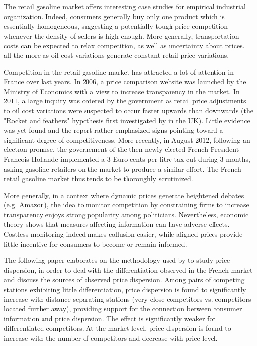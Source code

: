 \documentclass[english]{article}
\begin{document}
The retail gasoline market offers interesting case studies for empirical industrial organization. Indeed, consumers generally buy only one product which is essentially homogeneous, suggesting a potentially tough price competition whenever the density of sellers is high enough. More generally, transportation costs can be expected to relax competition, as well as uncertainty about prices, all the more as oil cost variations generate constant retail price variations.

Competition in the retail gasoline market has attracted a lot of attention in France over last years. In 2006, a price comparison website was launched by the Ministry of Economics with a view to increase transparency in the market. In 2011, a large inquiry was ordered by the government as retail price adjustments to oil cost variations were suspected to occur faster upwards than downwards (the "Rocket and feathers" hypothesis first investigated by \cite{BAC91} in the UK). Little evidence was yet found and the report rather emphasized signs pointing toward a significant degree of competitiveness. More recently, in August 2012, following an election promise, the governement of the then newly elected French President Francois Hollande implemented a 3 Euro cents per litre tax cut during 3 months, asking gasoline retailers on the market to produce a similar effort. The French retail gasoline market thus tends to be thoroughly scrutinized.

More generally, in a context where dynamic prices generate heightened debates (e.g. Amazon), the idea to monitor competition by constraining firms to increase transparency enjoys strong popularity among politicians. Nevertheless, economic theory shows that measures affecting information can have adverse effects. Costless monitoring indeed makes collusion easier, while aligned prices provide little incentive for consumers to become or remain informed.

The following paper elaborates on the methodology used by \cite{TAP11} to study price dispersion, in order to deal with the differentiation observed in the French market and discuss the sources of observed price dispersion. Among pairs of competing stations exhibiting little differentiation, price dispersion is found to significantly increase with distance separating stations (very close competitors vs. competitors located further away), providing support for the connection between consumer information and price dispersion. The effect is significantly weaker for differentiated competitors. At the market level, price dispersion is found to increase with the number of competitors and decrease with price level.
\end{document}
